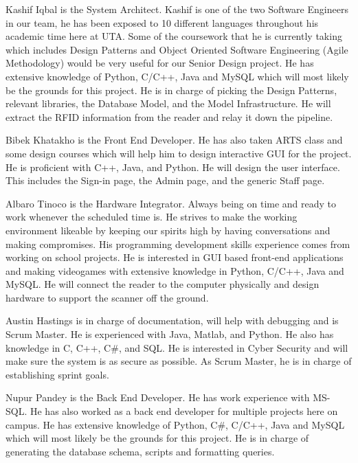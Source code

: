 \quad \quad Kashif Iqbal is the System Architect. Kashif is one of the two Software 
Engineers in our team, he has been exposed to 10 different languages throughout his 
academic time here at UTA. Some of the coursework that he is currently taking which 
includes Design Patterns and Object Oriented Software Engineering (Agile Methodology) 
would be very useful for our Senior Design project. He has extensive knowledge of 
Python, C/C++, Java and MySQL which will most likely be the grounds for this project. 
He is in charge of picking the Design Patterns, relevant libraries, the Database Model, and the Model Infrastructure. 
He will extract the RFID information from the reader and relay it down the pipeline. 
\par 
Bibek Khatakho is the Front End Developer. 
He has also taken ARTS class and some design courses which will help him to design 
interactive GUI for the project. He is proficient with C++, Java, and Python.
He will design the user interface. This includes the Sign-in page, the Admin page, and 
the generic Staff page. 
\par 
Albaro Tinoco is the Hardware Integrator. 
Always being on time and ready to work whenever the scheduled time is. He strives to 
make the working environment likeable by keeping our spirits high by having 
conversations and making compromises. His programming development skills experience 
comes from working on school projects. He is interested in GUI based front-end 
applications and making videogames with extensive knowledge in Python, C/C++, Java and 
MySQL. He will connect the reader to the computer physically and design hardware to 
support the scanner off the ground. 
\par 
Austin Hastings is in charge of documentation, will help with 
debugging and is Scrum Master. He is experienced with Java, Matlab, and Python. He also 
has knowledge in C, C++, C\#, and SQL. He is interested in Cyber Security and will make 
sure the system is as secure as possible. As Scrum Master, he is in charge of 
establishing sprint goals.
\par 
Nupur Pandey is the Back End Developer. 
He has work experience with MS- SQL. He has also worked as a back end developer for 
multiple projects here on campus. He has extensive knowledge of Python, C\#, C/C++, 
Java and MySQL which will most likely be the grounds for this project. 
He is in charge of generating the database schema, scripts and formatting queries.